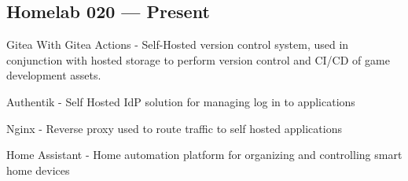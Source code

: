 \subsection{{Homelab \texorpdfstring{\hfill} \texorpdfstring{\null} 2020 --- Present}}
\begin{zitemize}
\item Gitea With Gitea Actions - Self-Hosted version control system, used in conjunction with hosted storage to perform version control and CI/CD of game development assets.
\item Authentik - Self Hosted IdP solution for managing log in to applications
\item Nginx - Reverse proxy used to route traffic to self hosted applications
\item Home Assistant - Home automation platform for organizing and controlling smart home devices
\end{zitemize}
